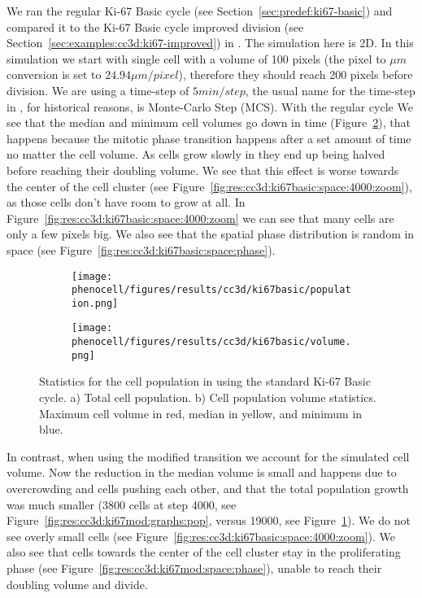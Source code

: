 We ran the regular Ki-67 Basic cycle (see Section~\ref{sec:predef:ki67-basic}) and compared it to the Ki-67 Basic cycle improved division (see Section~\ref{sec:examples:cc3d:ki67-improved}) in \ccd. The simulation here is 2D. In this simulation we start with single cell with a volume of 100 pixels (the pixel to $\mu m$ conversion is set to $24.94 \mu m/pixel$), therefore they should reach 200 pixels before division. We are using a time-step of $5min/step$, the usual name for the time-step in \ccd, for historical reasons, is Monte-Carlo Step (MCS).
With the regular cycle We see that the median and minimum cell volumes go down in time (Figure~\ref{fig:res:cc3d:ki67basic:graphs:vol}), that happens because the mitotic phase transition happens after a set amount of time no matter the cell volume. As cells grow slowly in \ccds they end up being halved before reaching their doubling volume. We see that this effect is worse towards the center of the cell cluster (see Figure~\ref{fig:res:cc3d:ki67basic:space:4000:zoom}), as those cells don't have room to grow at all. In Figure~\ref{fig:res:cc3d:ki67basic:space:4000:zoom} we can see that many cells are only a few pixels big. We also see that the spatial phase distribution is random in space (see Figure~\ref{fig:res:cc3d:ki67basic:space:phase}).


\begin{figure}[!htbp]
    \centering
    \begin{subfigure}{.9\linewidth}
        \texttt{[image: phenocell/figures/results/cc3d/ki67basic/population.png]}
        \caption{}\label{fig:res:cc3d:ki67basic:graphs:pop}
    \end{subfigure}
    \begin{subfigure}{.9\linewidth}
        \texttt{[image: phenocell/figures/results/cc3d/ki67basic/volume.png]}
        \caption{}\label{fig:res:cc3d:ki67basic:graphs:vol}
    \end{subfigure}
    \caption{Statistics for the cell population in \ccds using the standard Ki-67 Basic cycle. a) Total cell population. b) Cell population volume statistics. Maximum cell volume in red, median in yellow, and minimum in blue.}
    \label{fig:res:cc3d:ki67basic:graphs}
\end{figure}


In contrast, when using the modified transition we account for the simulated cell volume. Now the reduction in the median volume is small and happens due to overcrowding and cells pushing each other, and that the total population growth was much smaller (3800 cells at step 4000, see Figure~\ref{fig:res:cc3d:ki67mod:graphs:pop}, versus 19000, see Figure~\ref{fig:res:cc3d:ki67basic:graphs:pop}). We do not see overly small cells (see Figure~\ref{fig:res:cc3d:ki67basic:space:4000:zoom}). We also see that cells towards the center of the cell cluster stay in the proliferating phase (see Figure~\ref{fig:res:cc3d:ki67mod:space:phase}), unable to reach their doubling volume and divide.

